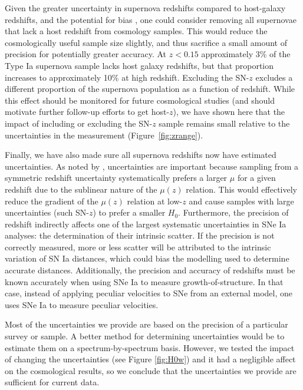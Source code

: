 \documentclass[
  journal=pasa,
  manuscript=research-paper,
  year=2022,
]{cup-journal}
\begin{document}
Given the greater uncertainty in supernova redshifts compared to host-galaxy redshifts, and the potential for bias \citep[as seen with SDSS SNe in][]{Zheng2008, Sako2018}, one could consider removing all supernovae that lack a host redshift from cosmology samples. 
This would reduce the cosmologically useful sample size slightly, and thus sacrifice a small amount of precision for potentially greater accuracy. 
At $z<0.15$ approximately 3\% of the Type Ia supernova sample lacks host galaxy redshifts, but that proportion increases to approximately 10\% at high redshift.  
Excluding the SN-$z$ excludes a different proportion of the supernova population as a function of redshift.  
While this effect should be monitored for future cosmological studies (and should motivate further follow-up efforts to get host-$z$), we have shown here that the impact of including or excluding the SN-$z$ sample remains small relative to the uncertainties in the measurement (Figure~\ref{fig:zrange}). 

Finally, we have also made sure all supernova redshifts now have estimated uncertainties.
As noted by \citet{Steinhardt2020}, uncertainties are important because sampling from a symmetric redshift uncertainty systematically prefers a larger $\mu$ for a given redshift due to the sublinear nature of the $\mu(z)$ relation.
This would effectively reduce the gradient of the $\mu(z)$ relation at low-$z$ and cause samples with large uncertainties (such SN-$z$) to prefer a smaller $H_0$.
Furthermore, the precision of redshift indirectly affects one of the largest systematic uncertainties in SNe Ia analyses: the determination of their intrinsic scatter. 
If the precision is not correctly measured, more or less scatter will be attributed to the intrinsic variation of SN Ia distances, which could bias the modelling used to determine accurate distances. 
Additionally, the precision and accuracy of redshifts must be known accurately when using SNe Ia to measure growth-of-structure. 
In that case, instead of applying peculiar velocities to SNe from an external model, one uses SNe Ia to measure peculiar velocities. 

Most of the uncertainties we provide are based on the precision of a particular survey or sample. 
A better method for determining uncertainties would be to estimate them on a spectrum-by-spectrum basis. 
However, we tested the impact of changing the uncertainties (see Figure \ref{fig:H0w}) and it had a negligible affect on the cosmological results, so we conclude that the uncertainties we provide are sufficient for current data. 
\end{document}
